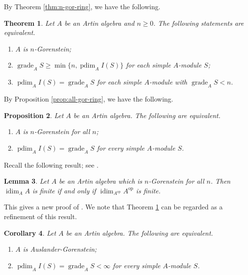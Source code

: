 \documentclass[a4paper,reqno]{amsart}
\numberwithin{equation}{section}
\theoremstyle{plain}
\newtheorem{thm}{Theorem}[section]
\newtheorem{prop}[thm]{Proposition}
\newtheorem{cor}[thm]{Corollary}
\newtheorem{lem}[thm]{Lemma}
\theoremstyle{definition}
\theoremstyle{remark}
\DeclareMathOperator{\grade}{grade}
\DeclareMathOperator{\pdim}{pdim}
\DeclareMathOperator{\idim}{idim}
\DeclareMathOperator{\op}{op}
\renewcommand{\-}{\mbox{-}}
\begin{document}
By Theorem \ref{thm:n-gor-ring}, we have the following.

\begin{thm}  \label{thm:n-gor}
    Let  \(A\) be an Artin algebra and \(n \ge 0\).
    The following statements are equivalent.
    \begin{enumerate}
    \item \(A\) is \(n\)-Gorenstein;
    \item \(\grade_AS\geq\min\{n,\pdim_AI(S)\}\) for each simple $A$-module \(S\);
    \item \(\pdim_AI(S)=\grade_AS\) for each simple $A$-module with \(\grade_AS<n\).
\end{enumerate}  
\end{thm}






By Proposition \ref{prop:all-gor-ring}, we have the following.


\begin{prop} \label{prop:all-gor}
    Let \(A\) be an Artin algebra. 
    The following  are  equivalent.
    \begin{enumerate}
        \item \(A\) is \(n\)-Gorenstein for all \(n\);
        \item \(\pdim_AI(S)=\grade_AS\) for every simple \(A\)-module \(S\).
    \end{enumerate}
\end{prop}


Recall the following  result; see \cite[Corollary 5.5]{AR94}.

\begin{lem} \label{lem:gor}
    Let \(A\) be an Artin algebra which  is \(n\)-Gorenstein for all \(n\).
    Then \(\idim_AA\) is finite if and only if \(\idim_{A^{\op}}{A^{\op}}\) is finite.
\end{lem}

This gives a new proof of  \cite[Theorem 3.3]{KMT25}.
We note that Theorem \ref{thm:n-gor} 
can be regarded as a refinement of this result.

\begin{cor} \label{cor:aus-gor}
    Let \(A\) be an Artin algebra. The following are equivalent.
    \begin{enumerate}
        \item \(A\) is Auslander-Gorenstein;
        \item \(\pdim_AI(S)=\grade_AS<\infty\) for every simple \(A\)-module \(S\).
    \end{enumerate}
\end{cor}
\end{document}

